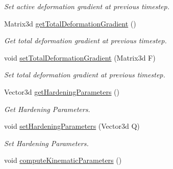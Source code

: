 \begin{DoxyCompactItemize}
\begin{DoxyCompactList}\small\item\em Set active deformation gradient at previous timestep. \item\end{DoxyCompactList}\item 
\hypertarget{classvoom_1_1_plastic_material_a3e04cd975694b821f8003376d884cc6b}{
Matrix3d \hyperlink{classvoom_1_1_plastic_material_a3e04cd975694b821f8003376d884cc6b}{getTotalDeformationGradient} ()}
\label{classvoom_1_1_plastic_material_a3e04cd975694b821f8003376d884cc6b}

\begin{DoxyCompactList}\small\item\em Get total deformation gradient at previous timestep. \item\end{DoxyCompactList}\item 
\hypertarget{classvoom_1_1_plastic_material_a0f9289951fce0ea5f41905aa2ee86a10}{
void \hyperlink{classvoom_1_1_plastic_material_a0f9289951fce0ea5f41905aa2ee86a10}{setTotalDeformationGradient} (Matrix3d F)}
\label{classvoom_1_1_plastic_material_a0f9289951fce0ea5f41905aa2ee86a10}

\begin{DoxyCompactList}\small\item\em Set total deformation gradient at previous timestep. \item\end{DoxyCompactList}\item 
\hypertarget{classvoom_1_1_plastic_material_a27e2d88950266103e0056a2d05dfa42c}{
Vector3d \hyperlink{classvoom_1_1_plastic_material_a27e2d88950266103e0056a2d05dfa42c}{getHardeningParameters} ()}
\label{classvoom_1_1_plastic_material_a27e2d88950266103e0056a2d05dfa42c}

\begin{DoxyCompactList}\small\item\em Get Hardening Parameters. \item\end{DoxyCompactList}\item 
\hypertarget{classvoom_1_1_plastic_material_ab958d2ac32859e9ffab6e196e09fd5cd}{
void \hyperlink{classvoom_1_1_plastic_material_ab958d2ac32859e9ffab6e196e09fd5cd}{setHardeningParameters} (Vector3d Q)}
\label{classvoom_1_1_plastic_material_ab958d2ac32859e9ffab6e196e09fd5cd}

\begin{DoxyCompactList}\small\item\em Set Hardening Parameters. \item\end{DoxyCompactList}\item 
\hypertarget{classvoom_1_1_plastic_material_afd05c2a128ff5ce53b317d433814c369}{
void \hyperlink{classvoom_1_1_plastic_material_afd05c2a128ff5ce53b317d433814c369}{computeKinematicParameters} ()}
\label{classvoom_1_1_plastic_material_afd05c2a128ff5ce53b317d433814c369}


\end{DoxyCompactItemize}
